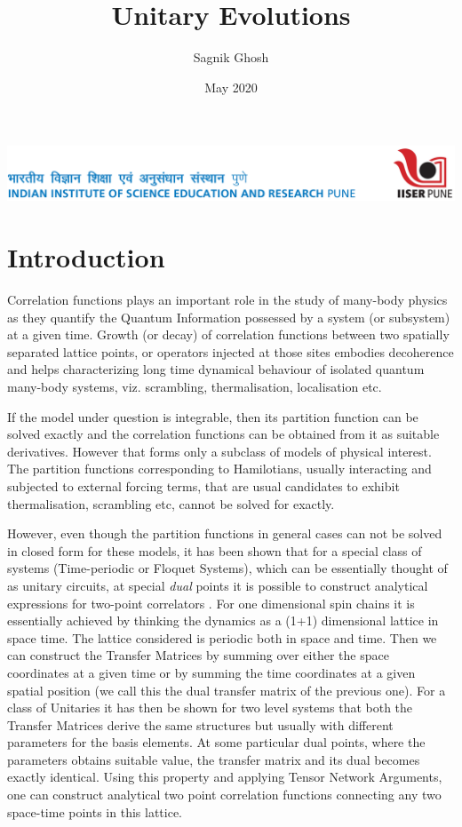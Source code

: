 \documentclass{amsart}
\title{Unitary Evolutions}
\author{Sagnik Ghosh}
\date{May 2020}
\begin{document}
\includegraphics[scale=0.95]{internal-lhead.png}
\vspace{20mm}

\maketitle


\section{Introduction}

Correlation functions plays an important role in the study of many-body physics as they quantify the Quantum Information possessed by a system (or subsystem) at a given time. Growth (or decay) of correlation functions between two spatially separated lattice points, or operators injected at those sites embodies decoherence and helps characterizing long time dynamical behaviour of isolated quantum many-body systems, viz. scrambling, thermalisation, localisation etc.

If the model under question is integrable, then its partition function can be solved exactly and the correlation functions can be obtained from it as suitable derivatives. However that forms only a subclass of models of physical interest. The partition functions corresponding to Hamilotians, usually interacting and subjected to external forcing terms, that are usual candidates to exhibit thermalisation, scrambling etc, cannot be solved for exactly.

However, even though the partition functions in general cases can not be solved in closed form for these models, it has been shown that for a special class of systems (Time-periodic or Floquet Systems), which can be essentially thought of as unitary circuits, at special \textit{dual} points it is possible to construct analytical expressions for two-point correlators \cite{chan2018solution,Bertini1}.  For one dimensional spin chains it is essentially achieved by thinking the dynamics as a (1+1) dimensional lattice in space time. The lattice considered is periodic both in space and time. Then we can construct the Transfer Matrices by summing over either the space coordinates at a given time or by summing the time coordinates at a given spatial position (we call this the dual transfer matrix of the previous one). For a class of Unitaries it has then be shown for two level systems\cite{Bertini1} that both the Transfer Matrices derive the same structures but usually with different parameters for the basis elements. At some particular dual points, where the parameters obtains suitable value, the transfer matrix and its dual becomes exactly identical. Using this property and applying Tensor Network Arguments\cite{orus2019tensor}, one can construct analytical two point correlation functions connecting any two space-time points in this lattice. 
\end{document}
